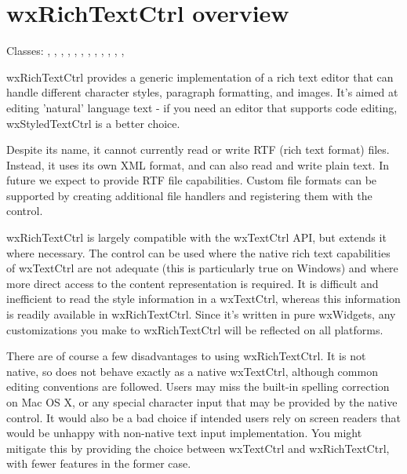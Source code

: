 \section{wxRichTextCtrl overview}\label{wxrichtextctrloverview}

Classes: , , 
, , 
, 
, 
, 
, 
, , 
, , 

wxRichTextCtrl provides a generic implementation of a rich text editor that can handle different character
styles, paragraph formatting, and images. It's aimed at editing 'natural' language text - if you need an editor that supports code editing,
wxStyledTextCtrl is a better choice.

Despite its name, it cannot currently read or write RTF (rich text format) files. Instead, it
uses its own XML format, and can also read and write plain text. In future we expect to provide
RTF file capabilities. Custom file formats can be supported by creating additional
file handlers and registering them with the control.

wxRichTextCtrl is largely compatible with the wxTextCtrl API, but extends it where necessary.
The control can be used where the native rich text capabilities of wxTextCtrl are not
adequate (this is particularly true on Windows) and where more direct access to
the content representation is required. It is difficult and inefficient to read
the style information in a wxTextCtrl, whereas this information is readily
available in wxRichTextCtrl. Since it's written in pure wxWidgets, any customizations
you make to wxRichTextCtrl will be reflected on all platforms.

There are of course a few disadvantages to using wxRichTextCtrl. It is not native,
so does not behave exactly as a native wxTextCtrl, although common editing conventions
are followed. Users may miss the built-in spelling correction on Mac OS X, or any
special character input that may be provided by the native control. It would also
be a bad choice if intended users rely on screen readers that would be unhappy
with non-native text input implementation. You might mitigate this by providing
the choice between wxTextCtrl and wxRichTextCtrl, with fewer features in the
former case.

